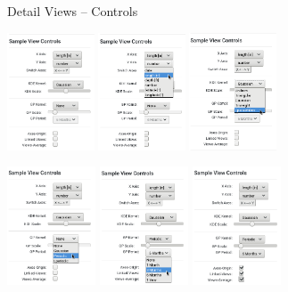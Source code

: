 \documentclass{beamer}
\begin{document}
\begin{frame}{Detail Views -- Controls}

  \begin{block}

  \centerline{
    \includegraphics[height=3.5cm]{./img/fview_ctrls.png}
    \includegraphics[height=3.5cm]{./img/fview_ctrls_yaxis.png}
    \includegraphics[height=3.5cm]{./img/fview_ctrls_kde.png}
  }

  \centerline{
    \includegraphics[height=3.5cm]{./img/fview_ctrls_gp.png}
    \includegraphics[height=3.5cm]{./img/fview_ctrls_gp_period.png}
    \includegraphics[height=3.5cm]{./img/fview_ctrls_checkboxes.png}
  }

  \end{block}

\end{frame}
\end{document}
